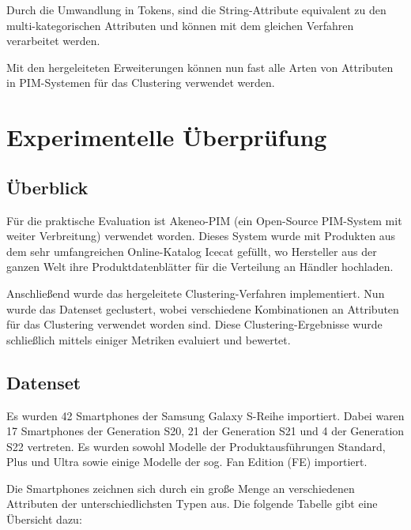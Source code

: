 Durch die Umwandlung in Tokens, sind die String-Attribute equivalent zu
den multi-kategorischen Attributen und können mit dem gleichen Verfahren
verarbeitet werden.

Mit den hergeleiteten Erweiterungen können nun fast alle Arten von
Attributen in PIM-Systemen für das Clustering verwendet werden.

\hypertarget{experimentelle-uxfcberpruxfcfung}{%
\section{Experimentelle
Überprüfung}\label{experimentelle-uxfcberpruxfcfung}}

\hypertarget{uxfcberblick}{%
\subsection{Überblick}\label{uxfcberblick}}

Für die praktische Evaluation ist Akeneo-PIM \autocite{akeneo2022about}
(ein Open-Source PIM-System mit weiter Verbreitung) verwendet worden.
Dieses System wurde mit Produkten aus dem sehr umfangreichen
Online-Katalog Icecat \autocite{icecat2021} gefüllt, wo Hersteller aus
der ganzen Welt ihre Produktdatenblätter für die Verteilung an Händler
hochladen.

Anschließend wurde das hergeleitete Clustering-Verfahren implementiert.
Nun wurde das Datenset geclustert, wobei verschiedene Kombinationen an
Attributen für das Clustering verwendet worden sind. Diese
Clustering-Ergebnisse wurde schließlich mittels einiger Metriken
evaluiert und bewertet.

\hypertarget{datenset}{%
\subsection{Datenset}\label{datenset}}

Es wurden 42 Smartphones der Samsung Galaxy S-Reihe importiert. Dabei
waren 17 Smartphones der Generation S20, 21 der Generation S21 und 4 der
Generation S22 vertreten. Es wurden sowohl Modelle der
Produktausführungen Standard, Plus und Ultra sowie einige Modelle der
sog. Fan Edition (FE) importiert.

Die Smartphones zeichnen sich durch ein große Menge an verschiedenen
Attributen der unterschiedlichsten Typen aus. Die folgende Tabelle gibt
eine Übersicht dazu:

